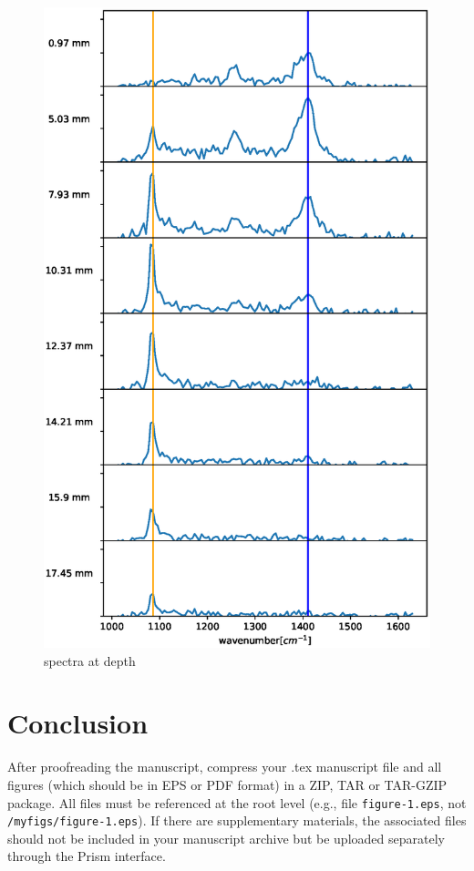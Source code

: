 \documentclass{osa-article}
\begin{document}
\begin{figure}
    \centering
    \includegraphics[scale = 0.4]{figure/multi8_depth.eps}
    \caption{spectra at depth}
    \label{fig:spectra_depth}
\end{figure}
\section{Conclusion}
After proofreading the manuscript, compress your .tex manuscript file and all figures (which should be in EPS or PDF format) in a ZIP, TAR or TAR-GZIP package. All files must be referenced at the root level (e.g., file \texttt{figure-1.eps}, not \texttt{/myfigs/figure-1.eps}). If there are supplementary materials, the associated files should not be included in your manuscript archive but be uploaded separately through the Prism interface.
\end{document}
